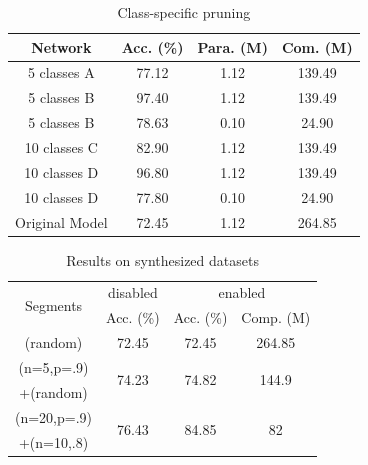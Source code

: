 \documentclass[pageno]{jpaper}
\begin{document}
\begin{table}
    \caption{Class-specific pruning}
    \label{tab:csPruning}

    \centering
    \begin{tabular}{ c|c|cc } 
     \hline
     Network & Acc. (\%) & Para. (M) & Com. (M) \\ 
     \hline
     5 classes A & 77.12 & 1.12 & 139.49 \\
     5 classes B & 97.40 & 1.12 & 139.49 \\
     5 classes B & 78.63 & 0.10 & 24.90 \\
     \hline
     10 classes C & 82.90 & 1.12 & 139.49 \\
     10 classes D & 96.80 & 1.12 & 139.49 \\
     10 classes D & 77.80 & 0.10 & 24.90 \\
     \hline
     Original Model & 72.45 & 1.12 & 264.85 \\
     \hline
    \end{tabular}
\end{table}





\begin{table}
    \centering
    \begin{tabular}{c|c|cc}
    \hline
    \multirow{2}{*}{Segments} & \multicolumn{1}{c|}{disabled} &  \multicolumn{2}{c}{enabled}\\
        & Acc. (\%)  & Acc. (\%)  & Comp. (M)    \\
    \hline
    (random)      & 72.45  & 72.45  & 264.85 \\
    \hline
    (n=5,p=.9)      & \multirow{2}{*}{74.23} & \multirow{2}{*}{74.82}  & \multirow{2}{*}{144.9}\\
    +(random) & &  & \\
    \hline
    (n=20,p=.9)      & \multirow{2}{*}{76.43} & \multirow{2}{*}{84.85}  & \multirow{2}{*}{82} \\
    +(n=10,.8) &  & & \\
    \hline

    
    \end{tabular}
    \caption{Results on synthesized datasets}
    \label{tab:synthe}
\end{table}
\end{document}
